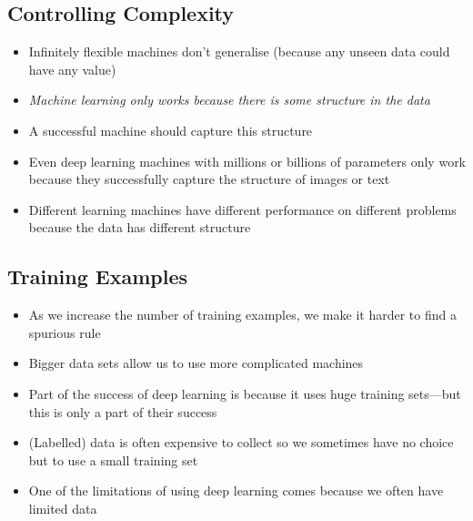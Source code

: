 \Outline %

\begin{slide}
\section{Controlling Complexity}

\begin{PauseHighLight}
  \begin{itemize}
  \item Infinitely flexible machines don't generalise\pause{} (because
    any unseen data could have any value)\pauseb
  \item \emph{Machine learning only works because there is
      some structure in the data}\pause
  \item A successful machine should capture this structure\pause
  \item Even deep learning machines with millions or billions of
    parameters only work because they successfully capture the
    structure of images or text\pause
  \item Different learning machines have different performance on
    different problems because the data has different structure\pause
  \end{itemize}
\end{PauseHighLight}

\end{slide}




\begin{slide}
\section{Training Examples}

\begin{PauseHighLight}
  \begin{itemize}
  \item As we increase the number of training examples, we make it harder
    to find a spurious rule\pause
  \item Bigger data sets allow us to use more complicated
    machines\pause
  \item Part of the success of deep learning is because it uses huge
    training sets\pause---but this is only a part of their success\pauseb
  \item (Labelled) data is often expensive to collect so we
    sometimes have no choice but to use a small training set\pause
  \item One of the limitations of using deep learning comes because we often
    have limited data\pause
  \end{itemize}
\end{PauseHighLight}

\end{slide}


